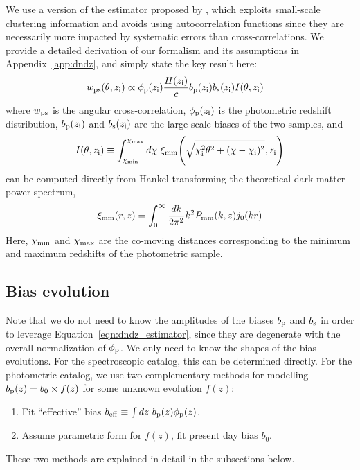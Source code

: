 We use a version of the estimator proposed by \cite{Menard13}, which exploits small-scale clustering information and avoids using autocorrelation functions since they are necessarily more impacted by systematic errors than cross-correlations. We provide a detailed derivation of our formalism and its assumptions in Appendix~\ref{app:dndz}, and simply state the key result here:
\begin{align}\label{eqn:dndz_estimator}
    {w}_{\rm ps}(\theta, z_{\rm i}) &\propto \phi_{\rm p}(z_{\rm i})\frac{H(z_{\rm i})}{c}b_{\rm p}(z_{\rm i})b_{\rm s}(z_{\rm i})I(\theta, z_{\rm i}) 
\end{align}
%
where ${w}_{\rm ps}$ is the angular cross-correlation, $\phi_{\rm p}(z_{\rm i})$ is the photometric redshift distribution, $b_{\rm p}(z_{\rm i})$ and $b_{\rm s}(z_{\rm i})$ are the large-scale biases of the two samples, and
%
\begin{equation}\label{I_term}
    I(\theta, z_{\rm i}) \equiv \int_{\chi_{\rm min}}^{\chi_{\rm max}}d\chi \ \xi_{\rm mm}{\Bigg (}\sqrt{\chi_{\rm i}^2\theta^2 + (\chi-\chi_{\rm i})^2},z_{\rm i}{\Bigg )}
\end{equation}
%
can be computed directly from Hankel transforming the theoretical dark matter power spectrum,
\begin{align}
    \xi_{\rm mm}(r,z) = \int_0^{\infty}\frac{dk}{2\pi^2}k^2P_{\rm mm}(k,z)j_0(kr)
\end{align}
Here, $\chi_{\rm min}$ and $\chi_{\rm max}$ are the co-moving distances corresponding to the minimum and maximum redshifts of the photometric sample.

\subsection{Bias evolution}

Note that we do not need to know the amplitudes of the biases $b_{\rm p}$ and $b_{\rm s}$ in order to leverage Equation~\ref{eqn:dndz_estimator}, since they are degenerate with the overall normalization of $\phi_{\rm p}$. We only need to know the shapes of the bias evolutions. For the spectroscopic catalog, this can be determined directly. For the photometric catalog, we use two complementary methods for modelling $b_{\rm p}(z) = b_0 \times f(z)$ for some unknown evolution $f(z)$:
\begin{enumerate}
    \item Fit ``effective'' bias $b_{\rm eff} \equiv \int dz \ b_{\rm p}(z)\phi_{\rm p}(z)$.
    \item Assume parametric form for $f(z)$, fit present day bias $b_0$.
\end{enumerate}
These two methods are explained in detail in the subsections below.


